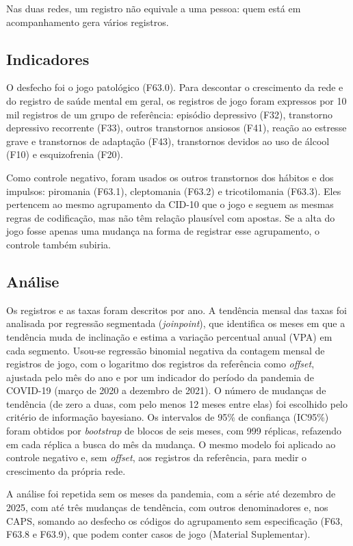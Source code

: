 \documentclass[12pt,a4paper]{article}
\begin{document}
Nas duas redes, um registro não equivale a uma pessoa: quem está em acompanhamento gera vários registros.

\subsection{Indicadores}

O desfecho foi o jogo patológico (F63.0). Para descontar o crescimento da rede e do registro de saúde mental em geral, os registros de jogo foram expressos por 10 mil registros de um grupo de referência: episódio depressivo (F32), transtorno depressivo recorrente (F33), outros transtornos ansiosos (F41), reação ao estresse grave e transtornos de adaptação (F43), transtornos devidos ao uso de álcool (F10) e esquizofrenia (F20).

Como controle negativo\citep{lipsitch2010}, foram usados os outros transtornos dos hábitos e dos impulsos: piromania (F63.1), cleptomania (F63.2) e tricotilomania (F63.3). Eles pertencem ao mesmo agrupamento da CID-10 que o jogo e seguem as mesmas regras de codificação, mas não têm relação plausível com apostas. Se a alta do jogo fosse apenas uma mudança na forma de registrar esse agrupamento, o controle também subiria.

\subsection{Análise}

Os registros e as taxas foram descritos por ano. A tendência mensal das taxas foi analisada por regressão segmentada (\emph{joinpoint})\citep{kim2000}, que identifica os meses em que a tendência muda de inclinação e estima a variação percentual anual (VPA) em cada segmento. Usou-se regressão binomial negativa da contagem mensal de registros de jogo, com o logaritmo dos registros da referência como \emph{offset}, ajustada pelo mês do ano e por um indicador do período da pandemia de COVID-19 (março de 2020 a dezembro de 2021). O número de mudanças de tendência (de zero a duas, com pelo menos 12 meses entre elas) foi escolhido pelo critério de informação bayesiano\citep{schwarz1978}. Os intervalos de 95\% de confiança (IC95\%) foram obtidos por \emph{bootstrap} de blocos de seis meses\citep{kunsch1989}, com 999 réplicas, refazendo em cada réplica a busca do mês da mudança. O mesmo modelo foi aplicado ao controle negativo e, sem \emph{offset}, aos registros da referência, para medir o crescimento da própria rede.

A análise foi repetida sem os meses da pandemia, com a série até dezembro de 2025, com até três mudanças de tendência, com outros denominadores e, nos CAPS, somando ao desfecho os códigos do agrupamento sem especificação (F63, F63.8 e F63.9), que podem conter casos de jogo (Material Suplementar).
\end{document}
